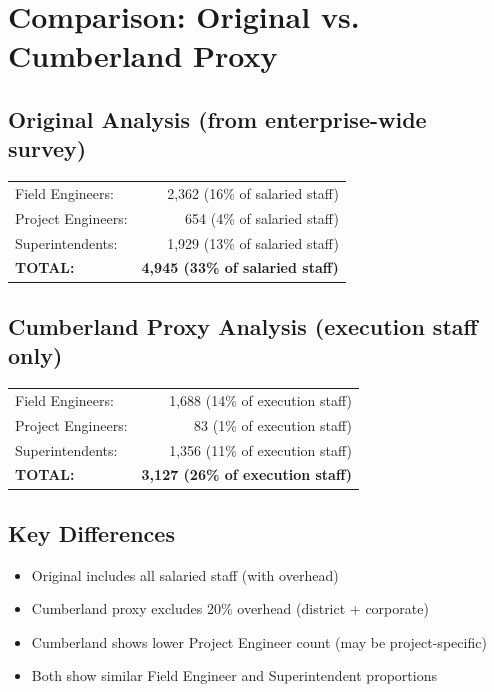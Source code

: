 \documentclass[11pt, letterpaper]{article}
\begin{document}
\vspace{1em}

\section*{Comparison: Original vs. Cumberland Proxy}

\subsection*{Original Analysis (from enterprise-wide survey)}
\begin{center}
\begin{tabular}{lr}
Field Engineers: & 2,362 (16\% of salaried staff) \\
Project Engineers: & 654 (4\% of salaried staff) \\
Superintendents: & 1,929 (13\% of salaried staff) \\
\midrule
\textbf{TOTAL:} & \textbf{4,945 (33\% of salaried staff)} \\
\end{tabular}
\end{center}

\subsection*{Cumberland Proxy Analysis (execution staff only)}
\begin{center}
\begin{tabular}{lr}
Field Engineers: & 1,688 (14\% of execution staff) \\
Project Engineers: & 83 (1\% of execution staff) \\
Superintendents: & 1,356 (11\% of execution staff) \\
\midrule
\textbf{TOTAL:} & \textbf{3,127 (26\% of execution staff)} \\
\end{tabular}
\end{center}

\subsection*{Key Differences}
\begin{itemize}[nosep, leftmargin=2em]
    \item Original includes all salaried staff (with overhead)
    \item Cumberland proxy excludes 20\% overhead (district + corporate)
    \item Cumberland shows lower Project Engineer count (may be project-specific)
    \item Both show similar Field Engineer and Superintendent proportions
\end{itemize}
\end{document}
